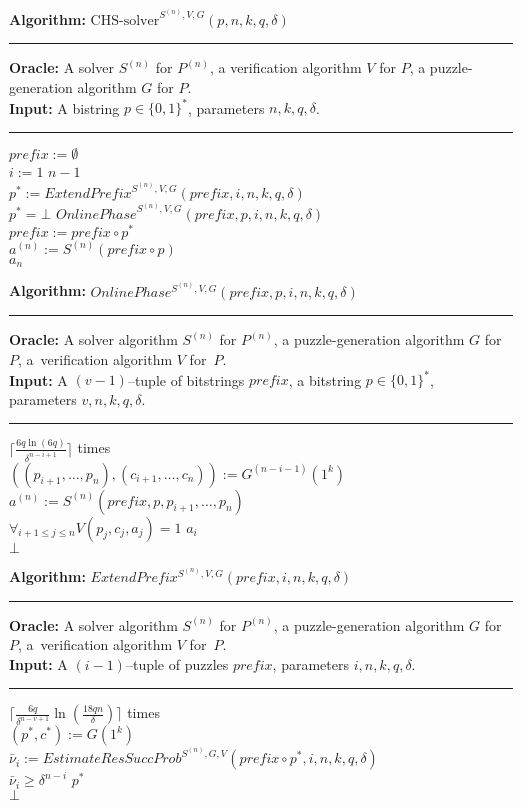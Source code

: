 \begin{codeblock}
  \textbf{Algorithm:} $\text{CHS-solver}^{S^{(n)},V,G}(p, n, k, q, \delta)$
  \medskip\hrule
  \textbf{Oracle:} A solver $S^{(n)}$ for $P^{(n)}$, a verification algorithm $V$ for $P$, a puzzle-generation algorithm $G$ for $P$.\\
  \textbf{Input:}  A bistring $p \in \{0,1\}^{*}$, parameters $n, k, q, \delta$.
  \medskip\hrule
  $\mathit{prefix} := \emptyset$\\
  \For $i := 1$ \To $n\!-\!1$ \Do \\
  \IndI $p^* := \mathit{ExtendPrefix}^{S^{(n)}, V, G}(\mathit{prefix}, i, n, k, q, \delta)$\\
  \IndI \If $p^* = \bot$ \Then \Return $\mathit{OnlinePhase}^{S^{(n)}, V, G}(\mathit{prefix}, p, i, n, k, q, \delta)$ \\
  \IndI \Else $\mathit{prefix} := \mathit{prefix} \circ p^*$\\
  $ a^{(n)} := S^{(n)}(\mathit{prefix} \circ p)$ \\
  \Return $a_n$
\end{codeblock}
%
\begin{codeblock}
  \textbf{Algorithm:} $\mathit{OnlinePhase^{S^{(n)}, V, G}(\mathit{prefix}, p, i, n, k, q, \delta)}$
  \medskip \hrule
  \textbf{Oracle:} A solver algorithm $S^{(n)}$ for $P^{(n)}$, a puzzle-generation algorithm $G$ for $P$, a~verification algorithm $V$ for~$P$.\\
  \textbf{Input:} A $(v-1)$--tuple of bitstrings $\mathit{prefix}$, a bitstring $p \in \{0,1\}^{*}$, \\ parameters $v, n, k, q, \delta$.
  \medskip\hrule
  \Repeat $\Big\lceil\frac{6q \ln (6q)}{\delta^{n-i+1}}\Big\rceil$ times \\
  \IndI $((p_{i+1}, \dotsc, p_{n}),(c_{i+1}, \dots, c_n)) := G^{(n-i-1)}(1^k)$\\
  \IndI $a^{(n)} := S^{(n)}(\mathit{prefix}, p, p_{i+1}, \dotsc, p_n)$\\
  \IndI \If $\forall_{i+1 \leq j \leq n} V(p_j, c_j, a_j) = 1$ \Then \Return $a_i$\\
  \Return $\bot$
\end{codeblock}
%
\begin{codeblock}
  \textbf{Algorithm:} $\mathit{ExtendPrefix^{S^{(n)}, V, G}(prefix, i, n, k, q, \delta)}$
  \medskip \hrule
  \textbf{Oracle:} A solver algorithm $S^{(n)}$ for $P^{(n)}$, a puzzle-generation algorithm $G$ for $P$, a~verification algorithm $V$ for~$P$.\\
  \textbf{Input:} A $(i-1)$--tuple of puzzles $\mathit{prefix}$, parameters $i, n, k, q, \delta$.
  \medskip\hrule
  \Repeat $\Big\lceil \frac{6q}{\delta^{n-v+1}} \ln (\frac{18qn}{\delta}) \Big\rceil$ times \\
  \IndI $(p^*, c^*) := G(1^k) $\\
  \IndI $\bar{\nu}_i := \mathit{EstimateResSuccProb}^{S^{(n)},G,V}(\mathit{prefix} \circ p^*, i, n, k, q, \delta)$\\
  \IndI \If $\bar{\nu}_i \geq \delta^{n-i}$ \Then \Return $p^*$ \\
  \Return $\bot$
\end{codeblock}

